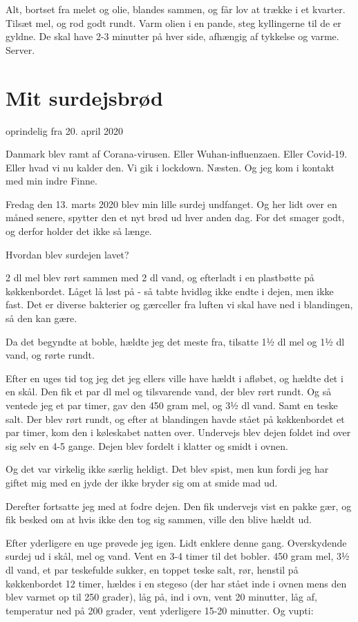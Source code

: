 \documentclass[
]{book}
\begin{document}
Alt, bortset fra melet og olie, blandes sammen, og får lov at trække i et kvarter. Tilsæt mel, og rod godt rundt. Varm olien i en pande, steg kyllingerne til de er gyldne. De skal have 2-3 minutter på hver side, afhængig af tykkelse og varme.
Server.

\hypertarget{mit-surdejsbruxf8d-1}{%
\section{Mit surdejsbrød}\label{mit-surdejsbruxf8d-1}}

oprindelig fra 20. april 2020

Danmark blev ramt af Corana-virusen. Eller Wuhan-influenzaen. Eller Covid-19. Eller hvad vi nu kalder den. Vi gik i lockdown. Næsten. Og jeg kom i kontakt med min indre Finne.

Fredag den 13. marts 2020 blev min lille surdej undfanget. Og her lidt over en måned senere, spytter den et nyt brød ud hver anden dag. For det smager godt, og derfor holder det ikke så længe.

Hvordan blev surdejen lavet?

2 dl mel blev rørt sammen med 2 dl vand, og efterladt i en plastbøtte på køkkenbordet. Låget lå løst på - så tabte hvidløg ikke endte i dejen, men ikke fast. Det er diverse bakterier og gærceller fra luften vi skal have ned i blandingen, så den kan gære.

Da det begyndte at boble, hældte jeg det meste fra, tilsatte 1½ dl mel og 1½ dl vand, og rørte rundt.

Efter en uges tid tog jeg det jeg ellers ville have hældt i afløbet, og hældte det i en skål. Den fik et par dl mel og tilsvarende vand, der blev rørt rundt. Og så ventede jeg et par timer, gav den 450 gram mel, og 3½ dl vand. Samt en teske salt. Der blev rørt rundt, og efter at blandingen havde stået på køkkenbordet et par timer, kom den i køleskabet natten over. Undervejs blev dejen foldet ind over sig selv en 4-5 gange. Dejen blev fordelt i klatter og smidt i ovnen.

Og det var virkelig ikke særlig heldigt. Det blev spist, men kun fordi jeg har giftet mig med en jyde der ikke bryder sig om at smide mad ud.

Derefter fortsatte jeg med at fodre dejen. Den fik undervejs vist en pakke gær, og fik besked om at hvis ikke den tog sig sammen, ville den blive hældt ud.

Efter yderligere en uge prøvede jeg igen. Lidt enklere denne gang. Overskydende surdej ud i skål, mel og vand. Vent en 3-4 timer til det bobler. 450 gram mel, 3½ dl vand, et par teskefulde sukker, en toppet teske salt, rør, henstil på køkkenbordet 12 timer, hældes i en stegeso (der har stået inde i ovnen mens den blev varmet op til 250 grader), låg på, ind i ovn, vent 20 minutter, låg af, temperatur ned på 200 grader, vent yderligere 15-20 minutter. Og vupti:
\end{document}
